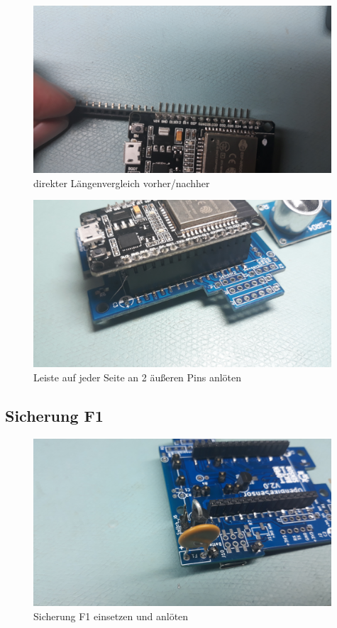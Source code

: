 \documentclass[12pt, a4paper]{article}		%
\begin{document}
\begin{figure}[H]
	\centering
		\includegraphics[width=0.99\textwidth]{Grafiken/20200726_213730.jpg}
	\caption{direkter Längenvergleich vorher/nachher}
	\label{fig:20200726_213730}
\end{figure}

\begin{figure}[H]
	\centering
		\includegraphics[width=0.99\textwidth]{Grafiken/20200902_192121.jpg}
	\caption{Leiste auf jeder Seite an 2 äußeren Pins anlöten}
	\label{fig:20200902_192121}
\end{figure}


\subsection{Sicherung F1}

\begin{figure}[H]
	\centering
		\includegraphics[width=0.99\textwidth]{Grafiken/20200726_180127.jpg}
	\caption{Sicherung F1 einsetzen und anlöten}
	\label{fig:20200726_180127}
\end{figure}
\end{document}
